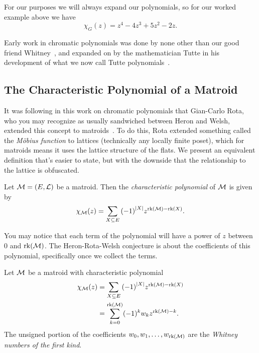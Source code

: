 \documentclass[12pt,oneside]{../../sfsuthesis}
\begin{document}
For our purposes we will always expand our polynomials, so for our worked example above we have
\[
    \chi_G(z) = z^4 - 4z^3 + 5z^2 - 2z.
\]

Early work in chromatic polynomials was done by none other than our good friend Whitney~\cite{whitneyColoringGraphs1932}, and expanded on by the mathematician Tutte in his development of what we now call Tutte polynomials~\cite{tutteContributionTheoryChromatic1954}.

\subsection{The Characteristic Polynomial of a Matroid}

It was following in this work on chromatic polynomials that Gian-Carlo Rota, who you may recognize as usually sandwiched between Heron and Welsh, extended this concept to matroids~\cite{rotaFoundationsCombinatorialTheory1964}.
To do this, Rota extended something called the \emph{M\"obius function} to lattices (technically any locally finite poset), which for matroids means it uses the lattice structure of the flats.
We present an equivalent definition that's easier to state, but with the downside that the relationship to the lattice is obfuscated.

\begin{definition}\th\label{def:characteristicPoly}

    Let \( \mathcal{M} = (E, \mathcal{L}) \) be a matroid.
    Then the \emph{characteristic polynomial} of \( \mathcal{M} \) is given by
    \[
        \chi_{\mathcal{M}}(z) = \sum_{X \subseteq E} {(-1)}^{|X|}z^{\operatorname{rk}(\mathcal{M}) - \operatorname{rk}(X)}.
    \]
\end{definition}

You may notice that each term of the polynomial will have a power of \( z \) between 0 and \( \operatorname{rk}(\mathcal{M}) \).
The Heron-Rota-Welsh conjecture is about the coefficients of this polynomial, specifically once we collect the terms.

\begin{definition}\label{def:whitneyNumber}
    Let \( \mathcal{M} \) be a matroid with characteristic polynomial
    \begin{align*}
        \chi_{\mathcal{M}}(z) & = \sum_{X \subseteq E} {(-1)}^{|X|}z^{\operatorname{rk}(\mathcal{M}) - \operatorname{rk}(X)} \\
                    & = \sum_{k=0}^{\operatorname{rk}(\mathcal{M})} (-1)^k w_k z^{\operatorname{rk}(\mathcal{M}) - k}.
    \end{align*}
    The unsigned portion of the coefficients \( w_0, w_1, \dots, w_{\operatorname{rk}(\mathcal{M})} \) are the \emph{Whitney numbers of the first kind}.

\end{definition}
\end{document}
